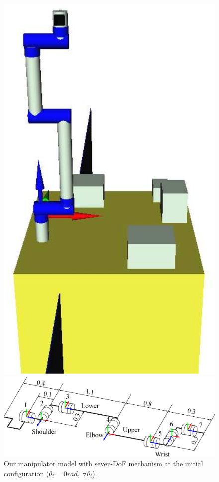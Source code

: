 %
\begin{figure}[t]
  \centering
  \begin{minipage}{0.25\linewidth}
    \centering
    \includegraphics[width=1.0\linewidth]{fig/chapter4/init.eps}
  \end{minipage}
  \begin{minipage}{0.65\linewidth}
    \centering
    \includegraphics[width=1.0\linewidth]{fig/chapter4/typeA_7R.eps}    
  \end{minipage}
  \caption{Our manipulator model with seven-DoF mechanism at the initial configuration ($\theta_{i} = 0\unit{rad},~\forall\theta_{i}$).}
  \label{fig:MODEL}
\end{figure}
